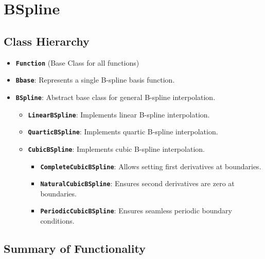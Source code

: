 \documentclass[a4paper]{article}
\begin{document}
\section{BSpline}

\subsection{Class Hierarchy}

\begin{itemize}
    \item \textbf{\texttt{Function}} (Base Class for all functions)
    \item \textbf{\texttt{Bbase}}: Represents a single B-spline basis function.
    \item \textbf{\texttt{BSpline}}: Abstract base class for general B-spline interpolation.
    \begin{itemize}
        \item \textbf{\texttt{LinearBSpline}}: Implements linear B-spline interpolation.
        \item \textbf{\texttt{QuarticBSpline}}: Implements quartic B-spline interpolation.
        \item \textbf{\texttt{CubicBSpline}}: Implements cubic B-spline interpolation.
        \begin{itemize}
            \item \textbf{\texttt{CompleteCubicBSpline}}: Allows setting first derivatives at boundaries.
            \item \textbf{\texttt{NaturalCubicBSpline}}: Ensures second derivatives are zero at boundaries.
            \item \textbf{\texttt{PeriodicCubicBSpline}}: Ensures seamless periodic boundary conditions.
        \end{itemize}
    \end{itemize}
\end{itemize}

\subsection{Summary of Functionality}
\end{document}
